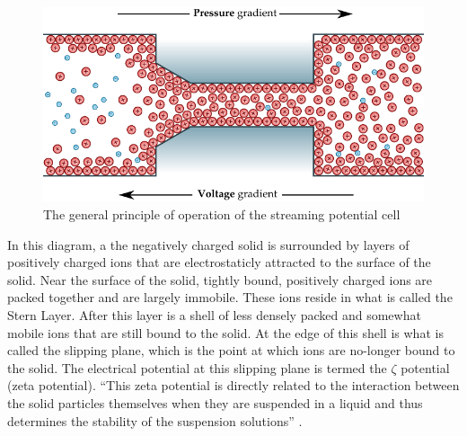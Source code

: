     \begin{figure} \centering
        \includegraphics{content/pt1/01-PowerHarvesting/graphics/streamingCellPrinciple}
        \caption{\label{fig:streamingCellPrinciple}The general principle of
            operation of the streaming potential cell} \end{figure} In this
    diagram, a the negatively charged solid is surrounded by layers of positively
    charged ions that are electrostaticly attracted to the surface of the solid.
    Near the surface of the solid, tightly bound, positively charged ions are
    packed together and are largely immobile.  These ions reside in what is called
    the Stern Layer. After this layer is a shell of less densely packed and
    somewhat mobile ions that are still bound to the solid. At the edge of this
    shell is what is called the slipping plane, which is the point at which ions
    are no-longer bound to the solid. The electrical potential at this slipping
    plane is termed the $\zeta$ potential (zeta potential). ``This zeta potential
    is directly related to the interaction between the solid particles themselves
    when they are suspended in a liquid and thus determines the stability of the
    suspension solutions'' \cite{Gu2000}.




